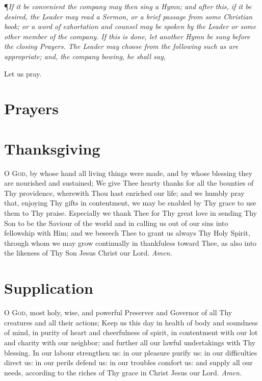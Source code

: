 \P \textit{If it be convenient the company may then sing a Hymn; and after this, if it be desired, the Leader may read a Sermon, or a brief passage from some Christian book; or a word of exhortation and counsel may be spoken by the Leader or some other member of the company.
If this is done, let another Hymn be sung before the closing Prayers.
The Leader may choose from the following such as are appropriate; and, the company bowing, he shall say,} \\

{\centering Let us pray. \par}

\section*{Prayers}

\section*{Thanksgiving} 

\lettrine{O}{ God,} by whose hand all living things were made, and by whose blessing they are nourished and sustained; We give Thee hearty thanks for all the bounties of Thy providence, wherewith Thou hast enriched our life; and we humbly pray that, enjoying Thy gifts in contentment, we may be enabled by Thy grace to use them to Thy praise.
Especially we thank Thee for Thy great love in sending Thy Son to be the Saviour of the world and in calling us out of our sins into fellowship with Him; and we beseech Thee to grant us always Thy Holy Spirit, through whom we may grow continually in thankfuless toward Thee, as also into the likeness of Thy Son Jesus Christ our Lord.
\textit{Amen.}

\section*{Supplication}

\lettrine{O}{ God,} most holy, wise, and powerful Preserver and Governor of all Thy creatures and all their actions; Keep us this day in health of body and soundness of mind, in purity of heart and cheerfulness of spirit, in contentment with our lot and charity with our neighbor; and further all our lawful undertakings with Thy blessing.
In our labour strengthen us: in our pleasure purify us: in our difficulties direct us: in our perils defend us: in our troubles comfort us: and supply all our needs, according to the riches of Thy grace in Christ Jesus our Lord.
\textit{Amen.}

